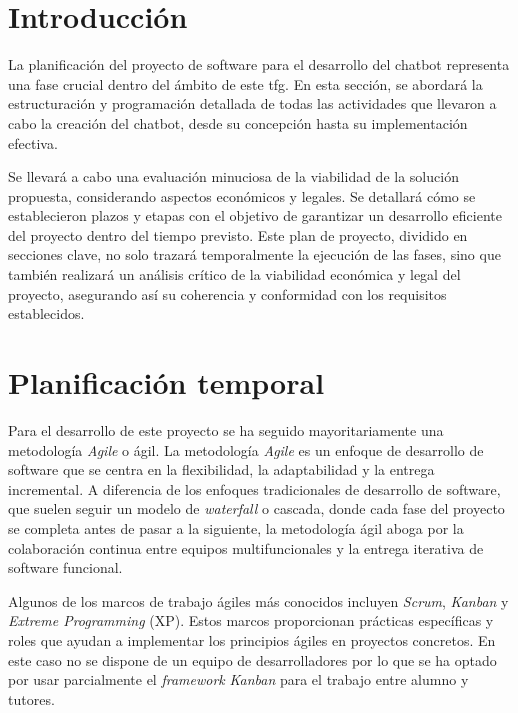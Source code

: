 
\section{Introducción}

La planificación del proyecto de software para el desarrollo del chatbot representa una fase crucial dentro del ámbito de este \acrlong{tfg}. En esta sección, se abordará la estructuración y programación detallada de todas las actividades que llevaron a cabo la creación del chatbot, desde su concepción hasta su implementación efectiva.

Se llevará a cabo una evaluación minuciosa de la viabilidad de la solución propuesta, considerando aspectos económicos y legales. Se detallará cómo se establecieron plazos y etapas con el objetivo de garantizar un desarrollo eficiente del proyecto dentro del tiempo previsto. Este plan de proyecto, dividido en secciones clave, no solo trazará temporalmente la ejecución de las fases, sino que también realizará un análisis crítico de la viabilidad económica y legal del proyecto, asegurando así su coherencia y conformidad con los requisitos establecidos.

\section{Planificación temporal}

Para el desarrollo de este proyecto se ha seguido mayoritariamente una metodología \textit{Agile} o ágil. La metodología \textit{Agile} es un enfoque de desarrollo de software que se centra en la flexibilidad, la adaptabilidad y la entrega incremental. A diferencia de los enfoques tradicionales de desarrollo de software, que suelen seguir un modelo de \textit{waterfall} o cascada, donde cada fase del proyecto se completa antes de pasar a la siguiente, la metodología ágil aboga por la colaboración continua entre equipos multifuncionales y la entrega iterativa de software funcional.

Algunos de los marcos de trabajo ágiles más conocidos incluyen \textit{Scrum}, \textit{Kanban} y \textit{Extreme Programming} (XP). Estos marcos proporcionan prácticas específicas y roles que ayudan a implementar los principios ágiles en proyectos concretos. En este caso no se dispone de un equipo de desarrolladores por lo que se ha optado por usar parcialmente el \textit{framework} \textit{Kanban} para el trabajo entre alumno y tutores.

